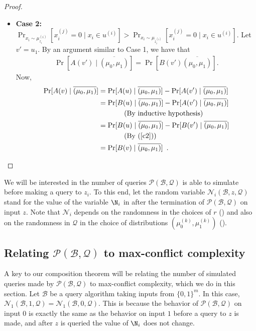 \documentclass{toc}
\newcommand{\clB}{\mathcal{B}}
\newcommand{\clQ}{\mathcal{Q}}
\newcommand{\clP}{\mathcal{P}}
\newcommand{\clN}{\mathcal{N}}
\newcommand{\ccc}{max-conflict complexity}
\begin{document}
\begin{proof}
\begin{description}
\begin{itemize}
\item {\bf Case 2:} $\Pr_{x_i \sim \mu_{z_i}^{(i)}}[x_i^{(j)}=0 \mid x_i \in u^{(i)}] > \Pr_{x_i \sim \mu_{\overline{z}_i^{(i)}}}[x_i^{(j)}=0 \mid x_i \in u^{(i)}]$.
Let $v'=u_1$. By an argument similar to Case 1, we have that 
\begin{align}
\Pr[A(v') \mid \overline{(\mu_0,\mu_1)}]=\Pr[B(v') \overline{(\mu_0,\mu_1)}]. \label{c2}
\end{align}
Now,
\begin{align}
\Pr[A(v) \mid \overline{(\mu_0,\mu_1)}] &=\Pr[A(u) \mid \overline{(\mu_0,\mu_1)}] - \Pr[A(v') \mid \overline{(\mu_0,\mu_1)}] \nonumber \\
&= \Pr[B(u) \mid \overline{(\mu_0,\mu_1)}] - \Pr[A(v') \mid \overline{(\mu_0,\mu_1)}]  \nonumber \\
&\mbox{\ \ \ \ \ \ \ \ \ \ \ (By inductive hypothesis)} \nonumber \\
&= \Pr[B(u) \mid \overline{(\mu_0,\mu_1)}] - \Pr[B(v') \mid \overline{(\mu_0,\mu_1)}] \nonumber \\
&\mbox{\ \ \ \ \ \ \ \ \ \ \ (By (\ref{c2}))} \nonumber \\
&= \Pr[B(v) \mid \overline{(\mu_0,\mu_1)}] \enspace. \nonumber
\end{align}
\end{itemize}
\end{description}
\end{proof}

We will be interested in the number of queries $\clP(\clB,\clQ)$ is able to simulate before making a query to $z_i$.  To this end, 
let the random variable $\clN_i(\clB, z, \clQ)$ stand for the value of the variable $\N_i$ in  after the termination of $\clP(\clB, \clQ)$ on input $z$.  Note that $\clN_i$ depends on the 
randomness in the choices of $r$ () and also on the randomness in $\clQ$ in the choice of distributions $(\mu_0^{(k)}, \mu_1^{(k)})$ ().
%
\subsection{\texorpdfstring{Relating $\clP(\clB, \clQ)$ to \ccc}{Relating
    P(B,Q) to max-conflict complexity}}
A key to our composition theorem will be relating the number of simulated queries made by $\clP(\clB, \clQ)$ to \ccc, which 
we do in this section.  Let $\clB$ be a query algorithm taking inputs from $\{0,1\}^m$.  In this case, 
$\clN_1(\clB, 1, \clQ) = \clN_1(\clB, 0, \clQ)$.  This is because the behavior of $\clP(\clB, \clQ)$ on input 
$0$ is exactly the same as the behavior on input $1$ before a query to $z$ is made, and after $z$ is queried the value of $\N_i$ does not change.
\end{document}
